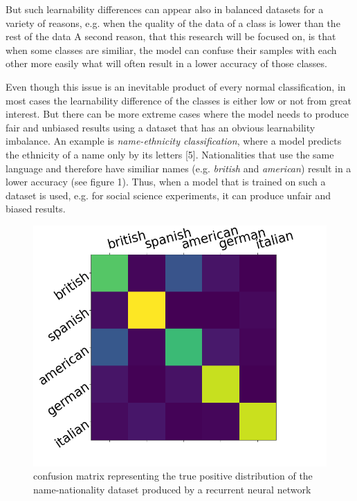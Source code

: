 \documentclass[journal]{IEEEtran}
\begin{document}

But such learnability differences can appear also in balanced datasets for a variety of reasons, e.g. when the quality of the data of a class is lower than the rest of the data %
A second reason, that this research will be focused on, is that when some classes are similiar, %
the model can confuse their samples with each other more easily what will often result in a lower accuracy of those classes.

Even though this issue is an inevitable product of every normal classification, in most cases the learnability difference of the classes is either low or not from great interest.
But there can be more extreme cases where the model needs to produce fair and unbiased results using a dataset that has an obvious learnability imbalance. 
An example is \emph{name-ethnicity classification}, where a model predicts the ethnicity of a name only by its letters [5]. 
Nationalities that use the same language and therefore have similiar names (e.g. \emph{british} and \emph{american}) result in a lower accuracy (see figure 1).
Thus, when a model that is trained on such a dataset is used, e.g. for social science experiments, it can produce unfair and biased results. 

\begin{figure}[h!]
        \includegraphics[width=\linewidth]{images/Figure_1.png}
        \caption{confusion matrix representing the true positive distribution of the name-nationality dataset produced by a recurrent neural network}
        \label{fig:tp_scores}
\end{figure}
\end{document}
